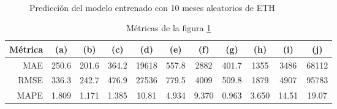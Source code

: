 \documentclass[a4paper,10pt]{article}
\begin{document}
\begin{figure}[H]
    \\
  \caption{Predicción del modelo entrenado con 10 meses aleatorios de ETH}
  \label{f:eth_mth_prophet}
\end{figure}

\begin{table}[H]
 \begin{center}
 \resizebox{12cm}{!} {
  \begin{tabular}{|r|c|c|c|c|c|c|c|c|c|c|}
    Métrica & (a) & (b) & (c) & (d) & (e) & (f) & (g) & (h) & (i) & (j) \\ \hline
    MAE  & 250.6 & 201.6 & 364.2 & 19618 & 557.8 & 2882 & 401.7 & 1355 & 3486 & 68112 \\
    RMSE & 336.3 & 242.7 & 476.9 & 27536 & 779.5 & 4009 & 509.8 & 1879 & 4907 & 95783 \\
    MAPE & 1.809 & 1.171 & 1.385 & 10.81 & 4.934 & 9.370 & 0.963 & 3.650 & 14.51 & 19.07 \\ \hline
  \end{tabular}
  }
  \caption{Métricas de la figura \ref{f:eth_mth_prophet}}
  \label{tab:eth_prophet_m}
 \end{center}
\end{table}
\end{document}
